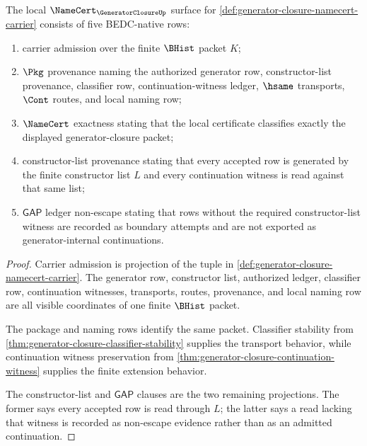\begin{theorem}
\label{thm:generator-closure-namecert-obligations}
The local $\NameCert_{\GeneratorClosureUp}$ surface for \autoref{def:generator-closure-namecert-carrier} consists of five BEDC-native rows:
\begin{enumerate}
\item carrier admission over the finite $\BHist$ packet $K$;
\item $\Pkg$ provenance naming the authorized generator row, constructor-list provenance, classifier row, continuation-witness ledger, $\hsame$ transports, $\Cont$ routes, and local naming row;
\item $\NameCert$ exactness stating that the local certificate classifies exactly the displayed generator-closure packet;
\item constructor-list provenance stating that every accepted row is generated by the finite constructor list $L$ and every continuation witness is read against that same list;
\item $\mathsf{GAP}$ ledger non-escape stating that rows without the required constructor-list witness are recorded as boundary attempts and are not exported as generator-internal continuations.
\end{enumerate}
\end{theorem}
\begin{proof}
Carrier admission is projection of the tuple in \autoref{def:generator-closure-namecert-carrier}. The generator row, constructor list, authorized ledger, classifier row, continuation witnesses, transports, routes, provenance, and local naming row are all visible coordinates of one finite $\BHist$ packet.

The package and naming rows identify the same packet. Classifier stability from \autoref{thm:generator-closure-classifier-stability} supplies the transport behavior, while continuation witness preservation from \autoref{thm:generator-closure-continuation-witness} supplies the finite extension behavior.

The constructor-list and $\mathsf{GAP}$ clauses are the two remaining projections. The former says every accepted row is read through $L$; the latter says a read lacking that witness is recorded as non-escape evidence rather than as an admitted continuation.
\end{proof}

